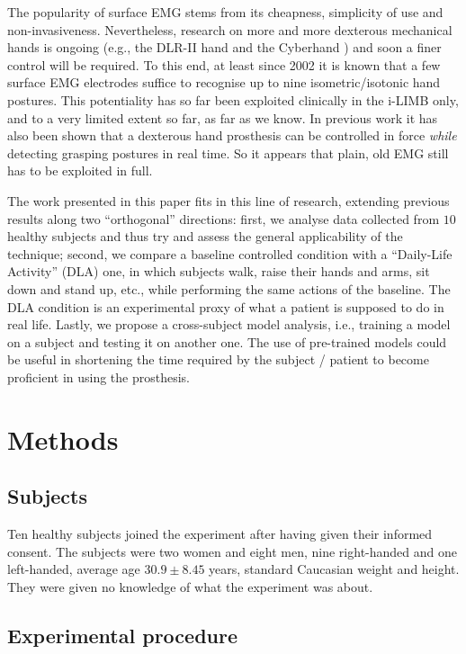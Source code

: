 \documentclass[10pt]{bmc_article}
\newenvironment{bmcformat}{\begin{raggedright}\baselineskip20pt\sloppy\setboolean{publ}{false}}{\end{raggedright}\baselineskip20pt\sloppy}
\begin{document}
\begin{bmcformat}
The popularity of surface EMG stems from its cheapness, simplicity of use
and non-invasiveness. Nevertheless, research on more and more dexterous
mechanical hands is ongoing (e.g., the DLR-II hand \cite{Hua2006} and the
Cyberhand \cite{cyberhand,cipriani}) and soon a finer control will be
required. To this end, at least since 2002
\cite{dunlop,zecca,smagt,2008.ICRA} it is known that a few surface EMG
electrodes suffice to recognise up to nine isometric/isotonic hand postures.
This potentiality has so far been exploited clinically in the i-LIMB only,
and to a very limited extent so far, as far as we know.
In previous work it has also been shown that
a dexterous hand prosthesis can be controlled in force \emph{while} detecting
grasping postures \cite{2008.ICRA,2008.BioCyb} in real time.
So it appears that plain, old EMG still has to be exploited in full.

The work presented in this paper fits in this line of research,
extending previous results along two ``orthogonal'' directions: first, we analyse
data collected from $10$ healthy subjects and thus try and assess the general
applicability of the technique; second, we compare a baseline controlled
condition with a ``Daily-Life Activity'' (DLA) one, in which subjects walk, raise
their hands and arms, sit down and stand up, etc., while performing the same
actions of the baseline. The DLA condition is an experimental proxy
of what a patient is supposed to do in real life. Lastly, we propose a
cross-subject model analysis, i.e., training a
model on a subject and testing it on another one. The use
of pre-trained models could be useful in shortening the time required by
the subject / patient to become proficient in using the prosthesis.

\section*{Methods}
\label{sec:m&ms}

\subsection*{Subjects}

Ten healthy subjects joined the experiment after having given their informed
consent. The subjects were two women and eight men, nine right-handed and one
left-handed, average age $30.9 \pm 8.45$ years, standard Caucasian weight and
height. They were given no knowledge of what the experiment was about.

\subsection*{Experimental procedure}


\end{bmcformat}
\end{document}
